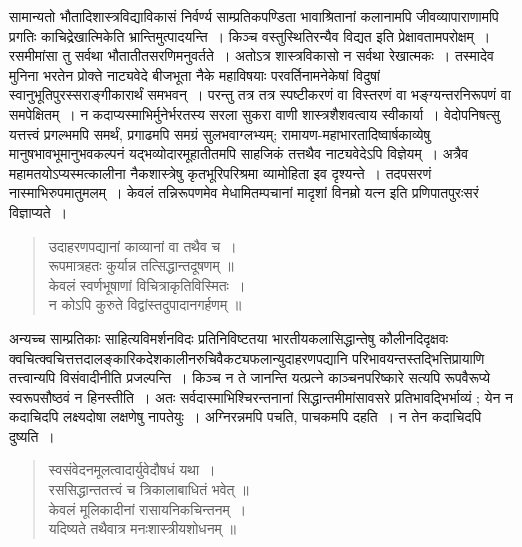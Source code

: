 {\dev सामान्यतो भौतादिशास्त्रविद्याविकासं निर्वर्ण्य साम्प्रतिकपण्डिता भावाश्रितानां कलानामपि जीवव्यापाराणामपि प्रगतिः काचिद्रेखात्मिकेति भ्रान्तिमुत्पादयन्ति~। किञ्च वस्तुस्थितिरन्यैव विद्यत इति प्रेक्षावतामपरोक्षम्~। रसमीमांसा तु सर्वथा भौतातीतसरणिमनुवर्तते~। अतोऽत्र शास्त्रविकासो न सर्वथा रेखात्मकः~। तस्मादेव मुनिना भरतेन प्रोक्ते नाट्यवेदे बीजभूता नैके महाविषयाः परवर्तिनामनेकेषां विदुषां स्वानुभूतिपुरस्सराङ्गीकारार्थं समभवन्~। परन्तु तत्र तत्र स्पष्टीकरणं वा विस्तरणं वा भङ्ग्यन्तरनिरूपणं वा समपेक्षितम्~। न कदाप्यस्माभिर्मुनेर्भरतस्य सरला सुकरा वाणी शास्त्रशैशवत्वाय स्वीकार्या~। वेदोपनिषत्सु यत्तत्त्वं प्रगल्भमपि समर्थं, प्रगाढमपि समग्रं सुलभवाग्लभ्यम्; रामायण-महाभारतादिष्वार्षकाव्येषु मानुषभावभूमानुभव\-कल्पनं यद्भव्योदारमूहातीतमपि साहजिकं तत्तथैव नाट्यवेदेऽपि विज्ञेयम्~। अत्रैव महामतयोऽप्यस्मत्कालीना नैकशास्त्रेषु कृतभूरिपरिश्रमा व्यामोहिता इव दृश्यन्ते~। तदपसरणं नास्माभिरुपमातुमलम्~। केवलं तन्निरूपणमेव मेधामितम्पचानां मादृशां विनम्रो यत्न इति प्रणिपातपुरःसरं विज्ञाप्यते~।}
\begin{quote}
{\dev उदाहरणपद्यानां काव्यानां वा तथैव च~।}\\
{\dev रूपमात्रहतः कुर्यान्न तत्सिद्धान्तदूषणम् ॥}\\[5pt]
{\dev केवलं स्वर्णभूषाणां विचित्राकृतिविस्मितः~।}\\
{\dev न कोऽपि कुरुते विद्वांस्तदुपादानगर्हणम् ॥}
\end{quote}

{\dev अन्यच्च साम्प्रतिकाः साहित्यविमर्शनविदः प्रतिनिविष्टतया भारतीयकलासिद्धान्तेषु कौलीन\-दिदृक्षवः क्वचित्क्वचित्तत्तदालङ्कारिकदेशकालीनरुचिवैकट्यफलान्युदाहरणपद्यानि परिभाव\-यन्त\-स्तद्भित्तिप्रायाणि तत्त्वान्यपि विसंवादीनीति प्रजल्पन्ति~। किञ्च न ते जानन्ति यत्प्रत्ने काञ्चन\-परिष्कारे सत्यपि रूपवैरूप्ये स्वरूपसौष्ठवं न हिनस्तीति~। अतः सर्वदास्माभिश्चिरन्त\-नानां सिद्धान्तमीमांसावसरे प्रतिभावद्भिर्भाव्यं ; येन न कदाचिदपि लक्ष्यदोषा लक्षणेषु नापतेयुः~। अग्निरन्नमपि पचति, पाचकमपि दहति~। न तेन कदाचिदपि दुष्यति~।}  
\begin{quote}
{\dev स्वसंवेदनमूलत्वादार्युवेदौषधं यथा~।}\\
{\dev रससिद्धान्ततत्त्वं च त्रिकालाबाधितं भवेत् ॥}\\[5pt]
{\dev केवलं मूलिकादीनां रासायनिकचिन्तनम्~।}\\
{\dev यदिष्यते तथैवात्र मनःशास्त्रीयशोधनम् ॥}
\end{quote}

